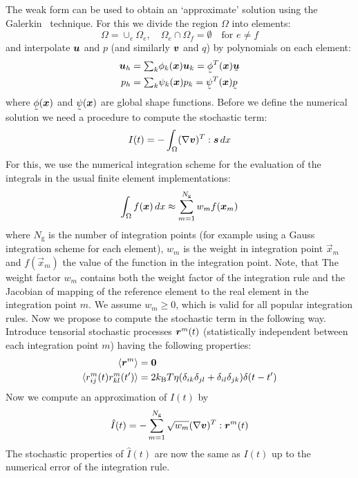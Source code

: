 The weak form can be used to obtain an `approximate' solution using the Galerkin \fem\
technique. For this we divide the region $\Omega$ into elements:
\[
\Omega=\cup_e\Omega_e, \quad\Omega_{e}\cap\Omega_{f}=\emptyset\quad
   \text{for }e\neq f
\]
and interpolate $\boldsymbol{u}$ and $p$ (and similarly $\boldsymbol{v}$ and $q$) by
polynomials on each element:
\[
 \begin{split}
    \vek u_h&=\tsum_k \phi_k(\vek x)\vek u_k=\col\phi^T(\vek x)\col{\vek u}\\
    p_h&=\tsum_k \psi_k(\vek x) p_k=\col\psi^T(\vek x)\col{ p}
 \end{split}
\]
where $\col\phi(\vek x)$ and $\col\psi(\vek x)$
are global shape functions. Before we define the numerical solution we need a
procedure to compute the stochastic term:
\begin{equation}
  I(t)=-\int_\Omega(\nabla\boldsymbol{v})^T:\boldsymbol{s}\,d x
\end{equation}
For this, we use the numerical
integration scheme for the evaluation of the integrals in the usual finite
element implementations:
\begin{equation}
   \int_\Omega f(\boldsymbol{x})\,d x\approx\sum_{m=1}^{N_\text{g}}w_mf(\boldsymbol{x}_m)
\end{equation}
where $N_\text{g}$ is the number of integration points (for example using a
Gauss integration scheme for each element), $w_m$ is
the weight in integration point $\vec x_m$ and
$f(\vec x_m)$ the value of the function in the integration point. Note, that
  The weight factor $w_m$ contains both the weight factor of the
        integration rule and the Jacobian of
        mapping of the reference element to the real
        element in the integration point $m$.
We assume $w_m\geq0$, which is valid for all popular integration rules.
Now we propose to compute the stochastic term in the following way. Introduce
tensorial stochastic processes $\boldsymbol{r}^m(t)$ (statistically independent
between each integration point $m$) having the following properties:
\begin{align}
   \langle \boldsymbol{r}^m \rangle &= \boldsymbol{0} \\
    \langle r^m_{ij}(t)r^m_{kl}(t')\rangle &=
     2k_\text{B}T\eta(\delta_{ik}\delta_{jl}    +
                      \delta_{il}\delta_{jk})\delta(t-t')    
\end{align}
Now we compute an approximation of $I(t)$ by
\begin{equation}
   \hat I(t)=-\sum_{m=1}^{N_\text{g}}\sqrt{w_m}(\nabla\boldsymbol{v})^T:\boldsymbol{r}^m(t)
\end{equation}
The stochastic properties of $\hat I(t)$ are now the same as $I(t)$
up to the numerical error of the integration rule.

